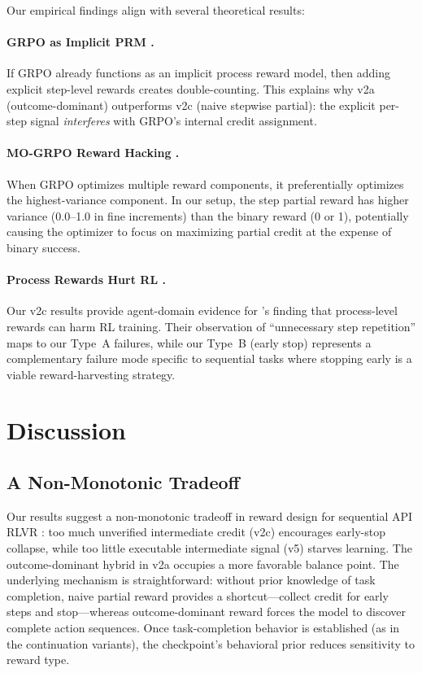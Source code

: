\documentclass[11pt]{article}
\begin{document}
Our empirical findings align with several theoretical results:

\paragraph{GRPO as Implicit PRM \citep{sullivan2025grpoprm}.}
If GRPO already functions as an implicit process reward model, then adding explicit step-level rewards creates double-counting.
This explains why v2a (outcome-dominant) outperforms v2c (naive stepwise partial): the explicit per-step signal \emph{interferes} with GRPO's internal credit assignment.

\paragraph{MO-GRPO Reward Hacking \citep{mogrpo2025}.}
When GRPO optimizes multiple reward components, it preferentially optimizes the highest-variance component.
In our setup, the step partial reward has higher variance (0.0--1.0 in fine increments) than the binary reward (0 or 1), potentially causing the optimizer to focus on maximizing partial credit at the expense of binary success.

\paragraph{Process Rewards Hurt RL \citep{gao2024designing}.}
Our v2c results provide agent-domain evidence for \citeauthor{gao2024designing}'s finding that process-level rewards can harm RL training.
Their observation of ``unnecessary step repetition'' maps to our Type~A failures, while our Type~B (early stop) represents a complementary failure mode specific to sequential tasks where stopping early is a viable reward-harvesting strategy.


\section{Discussion}
\label{sec:discussion}

\subsection{A Non-Monotonic Tradeoff}

Our results suggest a non-monotonic tradeoff in reward design for sequential API RLVR \citep{gao2024designing,toolrl2025}: too much unverified intermediate credit (v2c) encourages early-stop collapse, while too little executable intermediate signal (v5) starves learning.
The outcome-dominant hybrid in v2a occupies a more favorable balance point.
The underlying mechanism is straightforward: without prior knowledge of task completion, naive partial reward provides a shortcut---collect credit for early steps and stop---whereas outcome-dominant reward forces the model to discover complete action sequences.
Once task-completion behavior is established (as in the continuation variants), the checkpoint's behavioral prior reduces sensitivity to reward type.
\end{document}
